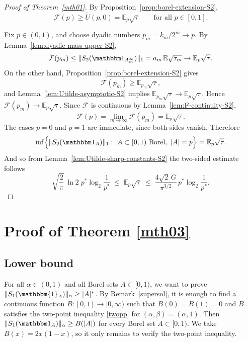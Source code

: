 \documentclass[11pt]{amsart}
\theoremstyle{definition}
\renewcommand{\1}{{\mathbbm{1}}}
\begin{document}
\begin{proof}[Proof of Theorem~\ref{mth01}]
By Proposition~\ref{prop:borel-extension-S2},
\[
\mathcal{F}(p)\ge \tilde U(p,0)=\mathbb E_p\sqrt{\tau}
\qquad\text{for all }p\in[0,1].
\]

Fix $p\in(0,1)$, and choose dyadic numbers $p_m=k_m/2^m\to p$. By Lemma~\ref{lem:dyadic-mass-upper-S2},
\[
\mathcal{F}(p_m)\le \|S_2(\mathbbm 1_{A_m^\infty})\|_1
=
a_m\,\mathbb E\sqrt{\tau_m}
\to
\mathbb E_p\sqrt{\tau}.
\]
On the other hand, Proposition~\ref{prop:borel-extension-S2} gives
\[
\mathcal{F}(p_m)\ge \mathbb E_{p_m}\sqrt{\tau},
\]
and Lemma~\ref{lem:Utilde-asymptotic-S2} implies
$\mathbb E_{p_m}\sqrt{\tau}\to \mathbb E_p\sqrt{\tau}.$
Hence
$
\mathcal{F}(p_m)\to \mathbb E_p\sqrt{\tau}.
$
Since $\mathcal{F}$ is continuous by Lemma~\ref{lem:F-continuity-S2},
\[
\mathcal{F}(p)=\lim_{m\to\infty}\mathcal{F}(p_m)=\mathbb E_p\sqrt{\tau}.
\]
The cases $p=0$ and $p=1$ are immediate, since both sides vanish. Therefore
\[
\inf\Bigl\{\|S_2(\mathbbm 1_A)\|_1:\ A\subset{[0,1)}\ \text{Borel},\ |A|=p\Bigr\}
=
\mathbb E_p\sqrt{\tau}.
\]
And so from Lemma~\ref{lem:Utilde-sharp-constants-S2} the two-sided estimate follows 
\[
\sqrt{\frac2\pi}\,\ln 2 \; p^*\log_2\frac1{p^*}
\;\le\;
\mathbb E_p\sqrt{\tau}
\;\le\;
\frac{4\sqrt2\,G}{\pi^{3/2}}\,p^*\log_2\frac1{p^*}.
\]

\end{proof}




































\section{Proof of Theorem \ref{mth03}}

\subsection{Lower bound}
For all $\alpha \in (0,1)$ and all Borel sets $A\subset {[0,1)}$, we want to prove
$\|S_1(\mathbbm{1}_{A})\|_{\alpha} \geq |A|^*$. By Remark~\ref{supersol}, it is enough to find a continuous function $B:[0,1]\to[0,\infty)$ such that $B(0)=B(1)=0$ and $B$ satisfies the two-point inequality \eqref{twopp} for $(\alpha,\beta)=(\alpha,1)$. Then $\|S_1(\mathbbm 1_A)\|_\alpha \ge B(|A|)$ for every Borel set $A\subset{[0,1)}$. We take $B(x)=2x(1-x)$, so it only remains to verify the two-point inequality.
\end{document}
